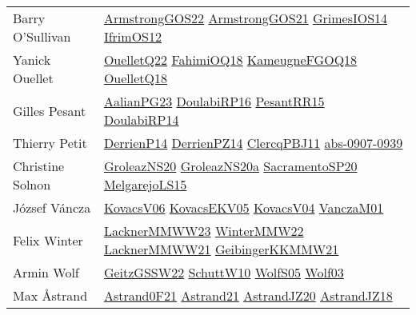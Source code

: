 {\begin{longtable}{p{4cm}p{20cm}}
Barry O'Sullivan & \href{papers/ArmstrongGOS22.pdf}{ArmstrongGOS22}\cite{ArmstrongGOS22} \href{papers/ArmstrongGOS21.pdf}{ArmstrongGOS21}\cite{ArmstrongGOS21} \href{articles/GrimesIOS14.pdf}{GrimesIOS14}\cite{GrimesIOS14} \href{papers/IfrimOS12.pdf}{IfrimOS12}\cite{IfrimOS12} \\
Yanick Ouellet & \href{papers/OuelletQ22.pdf}{OuelletQ22}\cite{OuelletQ22} \href{articles/FahimiOQ18.pdf}{FahimiOQ18}\cite{FahimiOQ18} \href{papers/KameugneFGOQ18.pdf}{KameugneFGOQ18}\cite{KameugneFGOQ18} \href{papers/OuelletQ18.pdf}{OuelletQ18}\cite{OuelletQ18} \\
Gilles Pesant & \href{papers/AalianPG23.pdf}{AalianPG23}\cite{AalianPG23} \href{}{DoulabiRP16}\cite{DoulabiRP16} \href{papers/PesantRR15.pdf}{PesantRR15}\cite{PesantRR15} \href{papers/DoulabiRP14.pdf}{DoulabiRP14}\cite{DoulabiRP14} \\
Thierry Petit & \href{papers/DerrienP14.pdf}{DerrienP14}\cite{DerrienP14} \href{papers/DerrienPZ14.pdf}{DerrienPZ14}\cite{DerrienPZ14} \href{papers/ClercqPBJ11.pdf}{ClercqPBJ11}\cite{ClercqPBJ11} \href{articles/abs-0907-0939.pdf}{abs-0907-0939}\cite{abs-0907-0939} \\
Christine Solnon & \href{papers/GroleazNS20.pdf}{GroleazNS20}\cite{GroleazNS20} \href{papers/GroleazNS20a.pdf}{GroleazNS20a}\cite{GroleazNS20a} \href{articles/SacramentoSP20.pdf}{SacramentoSP20}\cite{SacramentoSP20} \href{papers/MelgarejoLS15.pdf}{MelgarejoLS15}\cite{MelgarejoLS15} \\
J{\'{o}}zsef V{\'{a}}ncza & \href{papers/KovacsV06.pdf}{KovacsV06}\cite{KovacsV06} \href{papers/KovacsEKV05.pdf}{KovacsEKV05}\cite{KovacsEKV05} \href{papers/KovacsV04.pdf}{KovacsV04}\cite{KovacsV04} \href{papers/VanczaM01.pdf}{VanczaM01}\cite{VanczaM01} \\
Felix Winter & \href{articles/LacknerMMWW23.pdf}{LacknerMMWW23}\cite{LacknerMMWW23} \href{papers/WinterMMW22.pdf}{WinterMMW22}\cite{WinterMMW22} \href{papers/LacknerMMWW21.pdf}{LacknerMMWW21}\cite{LacknerMMWW21} \href{papers/GeibingerKKMMW21.pdf}{GeibingerKKMMW21}\cite{GeibingerKKMMW21} \\
Armin Wolf & \href{papers/GeitzGSSW22.pdf}{GeitzGSSW22}\cite{GeitzGSSW22} \href{papers/SchuttW10.pdf}{SchuttW10}\cite{SchuttW10} \href{papers/WolfS05.pdf}{WolfS05}\cite{WolfS05} \href{papers/Wolf03.pdf}{Wolf03}\cite{Wolf03} \\
Max {\AA}strand & \href{papers/Astrand0F21.pdf}{Astrand0F21}\cite{Astrand0F21} \href{}{Astrand21}\cite{Astrand21} \href{articles/AstrandJZ20.pdf}{AstrandJZ20}\cite{AstrandJZ20} \href{papers/AstrandJZ18.pdf}{AstrandJZ18}\cite{AstrandJZ18} \\

\end{longtable}}
